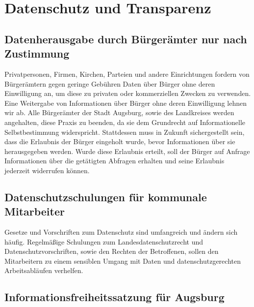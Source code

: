 \chapter{Datenschutz und Transparenz}

  \section{Datenherausgabe durch Bürgerämter nur nach Zustimmung}
  
  Privatpersonen, Firmen, Kirchen, Parteien und andere Einrichtungen fordern 
  von Bürgerämtern gegen geringe Gebühren Daten über Bürger ohne deren 
  Einwilligung an, um diese zu privaten oder kommerziellen Zwecken zu 
  verwenden. Eine Weitergabe von Informationen über Bürger ohne deren 
  Einwilligung lehnen wir ab. Alle Bürgerämter der Stadt Augsburg, sowie des 
  Landkreises werden angehalten, diese Praxis zu beenden, da sie dem 
  Grundrecht auf Informationelle Selbstbestimmung widerspricht. Stattdessen 
  muss in Zukunft sichergestellt sein, dass die Erlaubnis der Bürger eingeholt 
  wurde, bevor Informationen über sie herausgegeben werden. Wurde diese 
  Erlaubnis erteilt, soll der Bürger auf Anfrage Informationen über die 
  getätigten Abfragen erhalten und seine Erlaubnis jederzeit widerrufen 
  können. 
  
  \section{Datenschutzschulungen für kommunale Mitarbeiter}
  
  Gesetze und Vorschriften zum Datenschutz sind umfangreich und ändern sich 
  häufig. Regelmäßige Schulungen zum Landesdatenschutzrecht und 
  Datenschutzvorschriften, sowie den Rechten der Betroffenen, sollen den 
  Mitarbeitern zu einem sensiblen Umgang mit Daten und datenschutzgerechten 
  Arbeitsabläufen verhelfen.
  
  \section{Informationsfreiheitssatzung für Augsburg}
  
